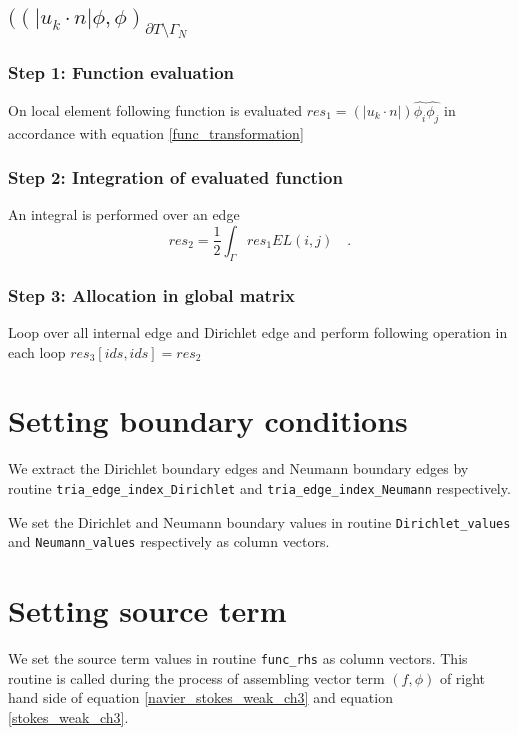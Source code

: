 \documentclass[a4paper,openany]{book}
\begin{document}
\subsection{$((|u_k \cdot n| \phi,\phi)_{\partial T \setminus \Gamma_N}$}

\subsubsection{Step 1: Function evaluation}

On local element following function is evaluated $res_1 = (|u_k \cdot n|) \hat{\phi_i} \hat{\phi_j} $ in accordance with equation \ref{func_transformation}\\
\subsubsection{Step 2: Integration of evaluated function}

An integral is performed over an edge
\begin{equation}
res_2 = \frac{1}{2} \int_{\Gamma} res_1 EL(i,j) \quad \textrm{.}
\end{equation}

\subsubsection{Step 3: Allocation in global matrix}

Loop over all internal edge and Dirichlet edge and perform following operation in each loop $res_3[ids,ids] = res_2$\\

\section{Setting boundary conditions}

We extract the Dirichlet boundary edges and Neumann boundary edges by routine \verb|tria_edge_index_Dirichlet| and \verb|tria_edge_index_Neumann| respectively.

We set the Dirichlet and Neumann boundary values in routine \verb|Dirichlet_values| and \verb|Neumann_values| respectively as column vectors. 

\section{Setting source term}

We set the source term values in routine \verb|func_rhs| as column vectors. This routine is called during the process of assembling vector term $(f,\phi)$ of right hand side of equation \ref{navier_stokes_weak_ch3} and equation \ref{stokes_weak_ch3}.
\end{document}

